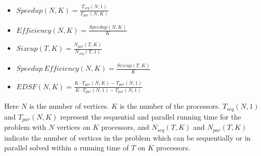 \documentclass[10pt]{article}
\begin{document}
\begin{itemize}
\item $Speedup(N,K)=\frac{T_{seq}(N,1)}{T_{par}(N,K)}$
\item $Efficiency(N,K)=\frac{Speedup(N,K)}{K}$
\item $Sizeup(T,K)=\frac{N_{par}(T,K)}{N_{seq}(T,1)}$
\item $Speedup~Efficiency(N,K)=\frac{Sizeup(T,K)}{K}$
\item $EDSF(N,K)=\frac{K\cdot T_{par}(N,K)-T_{par}(N,1)}{K\cdot T_{par}(N,1)-T_{par}(N,1)}$
\end{itemize}

Here $N$ is the number of vertices. $K$ is the number of the processors. $T_{seq}(N,1)$ and $T_{par}(N,K)$ represent the sequential and parallel running time for the problem with $N$ vertices on $K$ processors, and $N_{seq}(T,K)$ and $N_{par}(T,K)$ indicate the number of vertices in the problem which can be sequentially or in parallel solved within a running time of $T$ on $K$ processors. 




\end{document}
